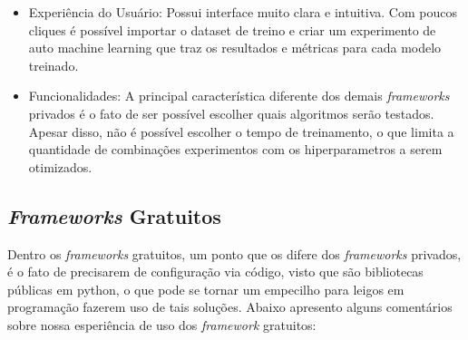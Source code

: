 \documentclass[9pt, a4paper, twocolumn]{article}
\begin{document}
\begin{itemize}
  \begin{itemize}
  \item
    Experiência do Usuário: Possui interface muito clara e intuitiva. Com poucos cliques é possível importar o dataset de treino e criar um experimento de auto machine learning que traz os resultados e métricas para cada modelo treinado.
  \item
    Funcionalidades: A principal característica diferente dos demais \emph{frameworks} privados é o fato de ser possível escolher quais algoritmos serão testados. Apesar disso, não é possível escolher o tempo de treinamento, o que limita a quantidade de combinações experimentos com os hiperparametros a serem otimizados.
  \end{itemize}
\end{itemize}

\hypertarget{frameworks-gratuitos}{%
\subsection{\texorpdfstring{\emph{Frameworks} Gratuitos}{Frameworks Gratuitos}}\label{frameworks-gratuitos}}

Dentro os \emph{frameworks} gratuitos, um ponto que os difere dos \emph{frameworks} privados, é o fato de precisarem de configuração via código, visto que são bibliotecas públicas em python, o que pode se tornar um empecilho para leigos em programação fazerem uso de tais soluções. Abaixo apresento alguns comentários sobre nossa esperiência de uso dos \emph{framework} gratuitos:
\end{document}
